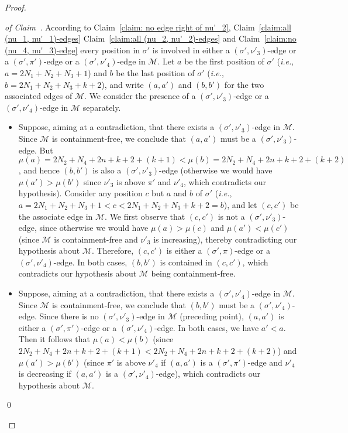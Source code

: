 \documentclass[a4paper]{llncs}
\begin{document}
\begin{proof}
  \begin{proof}[of Claim~\label{claim:no (sigma', nu'_3)-edge}]
    According to
    Claim~\ref{claim: no edge right of nu'_2},
    Claim~\ref{claim:all (nu_1, nu'_1)-edges}
    Claim~\ref{claim:all (nu_2, nu'_2)-edges} and
    Claim~\ref{claim:no (nu_4, nu'_3)-edge}
    every position in $\sigma'$ is involved in
    either a $(\sigma', \nu'_3)$-edge
    or a $(\sigma', \pi')$-edge
    or a $(\sigma', \nu'_4)$-edge
    in $\mathcal{M}$.
    Let $a$ be the first position of $\sigma'$
    (\emph{i.e.}, $a = 2N_1 + N_2 + N_3 + 1$)
    and
    $b$ be the last position of $\sigma'$
    (\emph{i.e.}, $b = 2N_1 + N_2 + N_3 + k + 2$),
    and write $(a, a')$ and $(b, b')$ for the two associated edges of $\mathcal{M}$.
    We consider the presence of a $(\sigma', \nu'_3)$-edge
    or a $(\sigma', \nu'_4)$-edge in $\mathcal{M}$ separately.
    \begin{itemize}
      \item
      Suppose, aiming at a contradiction, that there exists
      a $(\sigma', \nu'_3)$-edge in $\mathcal{M}$.
      Since $\mathcal{M}$ is containment-free, we conclude that
      $(a, a')$ must be a $(\sigma', \nu'_3)$-edge.
      But $\mu(a) = 2N_2 + N_4 + 2n + k + 2 + (k+1) <
      \mu(b) = 2N_2 + N_4 + 2n + k + 2 + (k+2)$, and hence
      $(b, b')$ is also a $(\sigma', \nu'_3)$-edge
      (otherwise we would have $\mu(a') > \mu(b')$ since
      $\nu'_3$ is above $\pi'$ and $\nu'_4$,
      which contradicts our hypothesis).
      Consider any position $c$ but $a$ and $b$ of $\sigma'$
      (\emph{i.e.},
      $a = 2N_1 + N_2 + N_3 + 1 < c < 2N_1 + N_2 + N_3 + k + 2 = b$),
      and let $(c, c')$ be the associate edge in $\mathcal{M}$.
      We first observe that $(c, c')$ is not a $(\sigma', \nu'_3)$-edge,
      since otherwise we would have
      $\mu(a) > \mu(c)$ and $\mu(a') < \mu(c')$
      (since $\mathcal{M}$ is containment-free and $\nu'_3$ is increasing),
      thereby contradicting our hypothesis about $\mathcal{M}$.
      Therefore, $(c, c')$ is either a $(\sigma', \pi)$-edge or a $(\sigma', \nu'_4)$-edge.
      In both cases, $(b, b')$ is contained in $(c, c')$,
      which contradicts our hypothesis about $\mathcal{M}$ being containment-free.
      \item
      Suppose, aiming at a contradiction, that there exists
      a $(\sigma', \nu'_4)$-edge in $\mathcal{M}$.
      Since $\mathcal{M}$ is containment-free, we conclude that
      $(b, b')$ must be a $(\sigma', \nu'_4)$-edge.
      Since there is no $(\sigma', \nu'_3)$-edge in $\mathcal{M}$
      (preceding point),
      $(a, a')$ is either a
      $(\sigma', \pi')$-edge or a $(\sigma', \nu'_4)$-edge.
      In both cases, we have $a' < a$.
      Then it follows that
      $\mu(a) < \mu(b)$
      (since $2N_2 + N_4 + 2n + k + 2 + (k+1) < 2N_2 + N_4 + 2n + k + 2 + (k+2)$)
      and
      $\mu(a') > \mu(b')$ (since $\pi'$ is above $\nu'_4$ if $(a, a')$ is
      a $(\sigma', \pi')$-edge and
      $\nu'_4$ is decreasing if $(a, a')$ is
      a $(\sigma', \nu'_4)$-edge),
      which contradicts our hypothesis about $\mathcal{M}$.
    \end{itemize}
    \qed
  \end{proof}


\end{proof}
\end{document}
